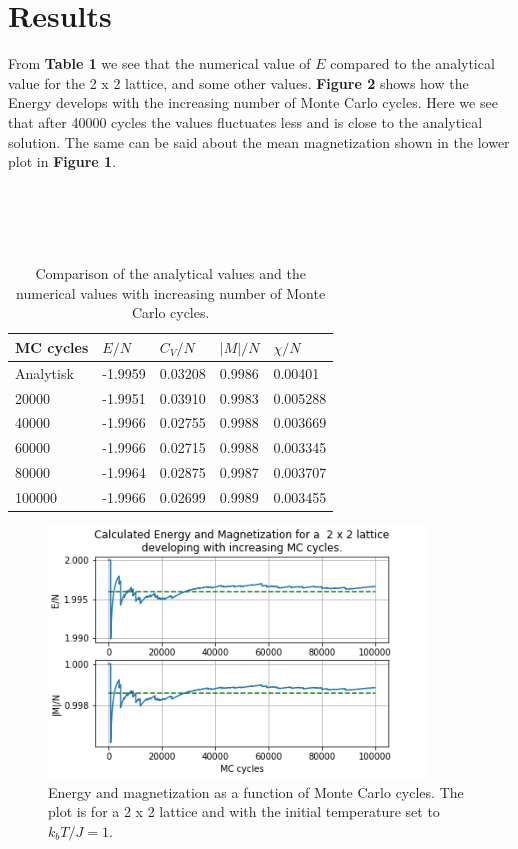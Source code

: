 \documentclass[twoside,twocolumn]{article}
\begin{document}

\section{Results}

From \textbf{Table 1} we see that the numerical value of $E$ compared to the analytical value for the 2 x 2 lattice, and some other values. \textbf{Figure 2} shows how the Energy develops with the increasing number of Monte Carlo cycles. Here we see that after 40000 cycles the values fluctuates less and is close to the analytical solution. The same can be said about the mean magnetization shown in the lower plot in \textbf{Figure 1}.
\\
\\
\\
\\
\\

\begin{table}
\begin{tabular}{|l|l|l|l|l|}
\hline
MC cycles &  ${E}/{N}$   & ${C_V}/{N}$    & ${|M|}/{N}$      & $ \chi/{N} $     \\ \hline
Analytisk & -1.9959 & 0.03208   & 0.9986   & 0.00401  \\ \hline
20000     & -1.9951 & 0.03910 & 0.9983 & 0.005288 \\ \hline
40000     & -1.9966 & 0.02755 & 0.9988 & 0.003669 \\ \hline
60000     & -1.9966 & 0.02715 & 0.9988 & 0.003345 \\ \hline
80000     & -1.9964 & 0.02875 & 0.9987 & 0.003707 \\ \hline
100000    & -1.9966 & 0.02699 & 0.9989 & 0.003455 \\ \hline
\end{tabular}
\caption{Comparison of the analytical values and the numerical values with increasing number of Monte Carlo cycles.}
\label{tab:my-table}

\end{table}
\begin{figure}[h]
  \includegraphics[width= 10cm]{N=2T=1.png}
  \caption{Energy and magnetization as a function of Monte Carlo cycles. The plot is for a 2 x 2 lattice and with the initial temperature set to $k_bT/J = 1$. }
  \label{fig:boat1}
\end{figure}
\end{document}
